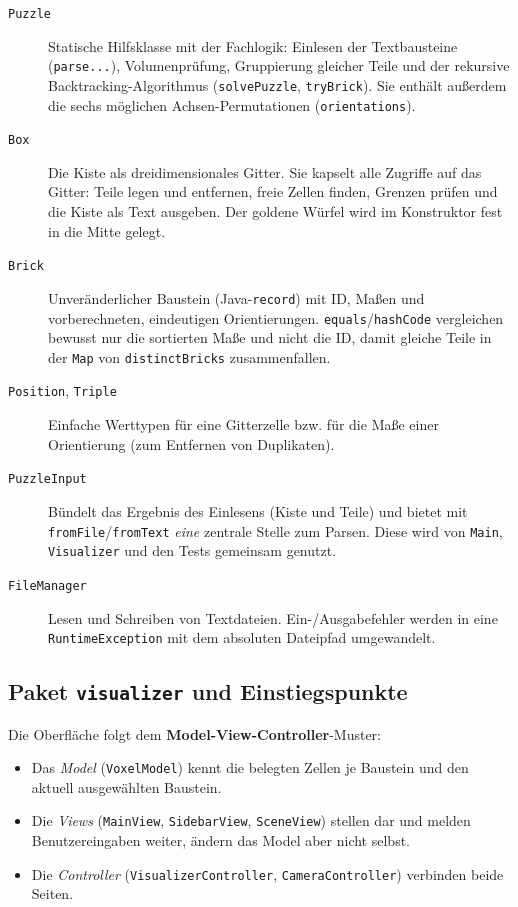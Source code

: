 \documentclass[11pt,a4paper,parskip=half]{scrartcl}
\newcommand{\code}[1]{\texttt{#1}}
\begin{document}
\begin{description}
  \item[\code{Puzzle}] Statische Hilfsklasse mit der Fachlogik: Einlesen der
    Textbausteine (\code{parse...}), Volumenprüfung, Gruppierung gleicher Teile und
    der rekursive Backtracking-Algorithmus (\code{solvePuzzle}, \code{tryBrick}).
    Sie enthält außerdem die sechs möglichen Achsen-Permutationen
    (\code{orientations}).
  \item[\code{Box}] Die Kiste als dreidimensionales Gitter. Sie kapselt alle
    Zugriffe auf das Gitter: Teile legen und entfernen, freie Zellen finden, Grenzen
    prüfen und die Kiste als Text ausgeben. Der goldene Würfel wird im Konstruktor
    fest in die Mitte gelegt.
  \item[\code{Brick}] Unveränderlicher Baustein (Java-\code{record}) mit ID, Maßen
    und vorberechneten, eindeutigen Orientierungen. \code{equals}/\code{hashCode}
    vergleichen bewusst nur die sortierten Maße und nicht die ID, damit gleiche Teile
    in der \code{Map} von \code{distinctBricks} zusammenfallen.
  \item[\code{Position}, \code{Triple}] Einfache Werttypen für eine Gitterzelle bzw.
    für die Maße einer Orientierung (zum Entfernen von Duplikaten).
  \item[\code{PuzzleInput}] Bündelt das Ergebnis des Einlesens (Kiste und Teile)
    und bietet mit \code{fromFile}/\code{fromText} \emph{eine} zentrale Stelle zum
    Parsen. Diese wird von \code{Main}, \code{Visualizer} und den Tests gemeinsam
    genutzt.
  \item[\code{FileManager}] Lesen und Schreiben von Textdateien. Ein-/Ausgabefehler
    werden in eine \code{RuntimeException} mit dem absoluten Dateipfad umgewandelt.
\end{description}

\subsection{Paket \code{visualizer} und Einstiegspunkte}

Die Oberfläche folgt dem \textbf{Model-View-Controller}-Muster:
\begin{itemize}
  \item Das \emph{Model} (\code{VoxelModel}) kennt die belegten Zellen je Baustein
        und den aktuell ausgewählten Baustein.
  \item Die \emph{Views} (\code{MainView}, \code{SidebarView}, \code{SceneView})
        stellen dar und melden Benutzereingaben weiter, ändern das Model aber nicht
        selbst.
  \item Die \emph{Controller} (\code{VisualizerController}, \code{CameraController})
        verbinden beide Seiten.
\end{itemize}
\end{document}

